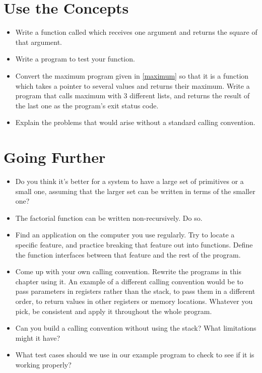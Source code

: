 \section{Use the Concepts}
\label{functionsreviewuseconcepts}

\begin{itemize}\item Write a function called  which receives one argument and returns the square of that argument. 
\item Write a program to test your  function. 
\item Convert the maximum program given in \autoref{maximum} so that it is a function which takes a pointer to several values and returns their maximum.  Write a program that calls maximum with 3 different lists, and returns the result of the last one as the program's exit status code. 
\item Explain the problems that would arise without a standard calling convention. 
\end{itemize}

\section{Going Further}

\begin{itemize}\item Do you think it's better for a system to have a large set of primitives or a small one, assuming that the larger set can be written in terms of the smaller one? 
\item The factorial function can be written non-recursively.  Do so. 
\item Find an application on the computer you use regularly.  Try to locate a specific feature, and practice breaking that feature out into functions.  Define the function interfaces between that feature and the rest of the program. 
\item Come up with your own calling convention.  Rewrite the programs in this chapter using it.  An example of a different calling convention would be to pass parameters in registers rather than the stack, to pass them in a different order, to return values in other registers or memory locations.  Whatever you pick, be consistent and apply it throughout the whole program. 
\item Can you build a calling convention without using the stack?  What limitations might it have? 
\item What test cases should we use in our example program to check to see if it is working properly? 
\end{itemize}

